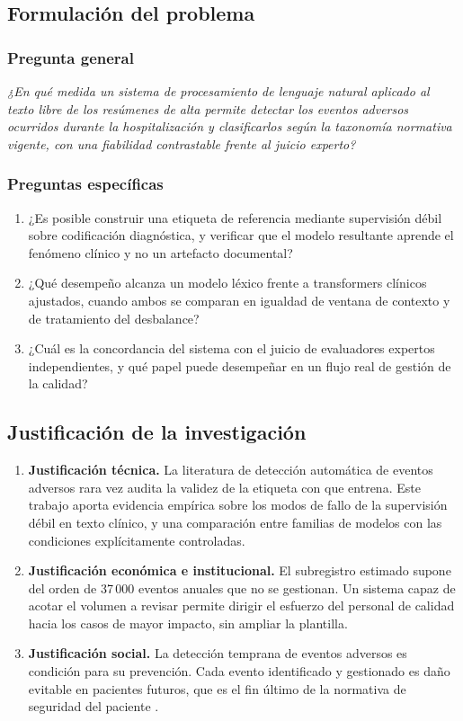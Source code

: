 \documentclass[conference]{IEEEtran}
\begin{document}
\subsection{Formulación del problema}

\subsubsection{Pregunta general}
\emph{¿En qué medida un sistema de procesamiento de lenguaje natural aplicado
al texto libre de los resúmenes de alta permite detectar los eventos adversos
ocurridos durante la hospitalización y clasificarlos según la taxonomía
normativa vigente, con una fiabilidad contrastable frente al juicio experto?}

\subsubsection{Preguntas específicas}
\begin{enumerate}
\item ¿Es posible construir una etiqueta de referencia mediante supervisión
débil sobre codificación diagnóstica, y verificar que el modelo resultante
aprende el fenómeno clínico y no un artefacto documental?
\item ¿Qué desempeño alcanza un modelo léxico frente a transformers clínicos
ajustados, cuando ambos se comparan en igualdad de ventana de contexto y de
tratamiento del desbalance?
\item ¿Cuál es la concordancia del sistema con el juicio de evaluadores
expertos independientes, y qué papel puede desempeñar en un flujo real de
gestión de la calidad?
\end{enumerate}

\subsection{Justificación de la investigación}
\begin{enumerate}
\item \textbf{Justificación técnica.} La literatura de detección automática de
eventos adversos rara vez audita la validez de la etiqueta con que entrena. Este
trabajo aporta evidencia empírica sobre los modos de fallo de la supervisión
débil en texto clínico, y una comparación entre familias de modelos con las
condiciones explícitamente controladas.
\item \textbf{Justificación económica e institucional.} El subregistro
estimado supone del orden de 37\,000 eventos anuales que no se gestionan. Un
sistema capaz de acotar el volumen a revisar permite dirigir el esfuerzo del
personal de calidad hacia los casos de mayor impacto, sin ampliar la plantilla.
\item \textbf{Justificación social.} La detección temprana de eventos adversos
es condición para su prevención. Cada evento identificado y gestionado es daño
evitable en pacientes futuros, que es el fin último de la normativa de
seguridad del paciente \cite{who}.
\end{enumerate}
\end{document}
